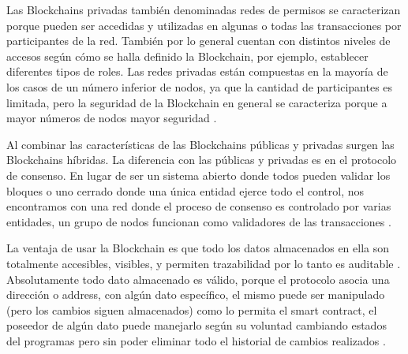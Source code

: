 Las  Blockchains privadas también denominadas redes de permisos se caracterizan porque  pueden ser accedidas y utilizadas en algunas o todas las transacciones
por participantes de la red.  También por lo general cuentan con  distintos niveles de accesos según cómo se halla definido la Blockchain, por ejemplo, establecer 
diferentes tipos de roles.
Las redes privadas están compuestas en la mayoría de los casos de un número inferior de nodos, ya que la cantidad de participantes 
es limitada, pero la seguridad de la  Blockchain en general se caracteriza  porque a mayor números de nodos mayor seguridad \cite[]{torres_Blockchain_nodate}.

Al combinar las características de las  Blockchains públicas y privadas surgen las
 Blockchains híbridas. La  diferencia con las públicas y privadas  es 
en el protocolo de consenso. En lugar de ser un sistema abierto donde todos pueden validar los
bloques o uno cerrado donde una única entidad ejerce todo el control, nos encontramos con una
red donde el proceso de consenso es controlado por varias entidades, un grupo de nodos
funcionan como validadores de las transacciones \cite[]{torres_Blockchain_nodate}.

La ventaja de usar la  Blockchain es que todo los datos almacenados en ella son totalmente
accesibles, visibles, y permiten trazabilidad por lo tanto es  auditable \cite[]{drescher_Blockchain_2017}.
Absolutamente todo dato almacenado 
es válido, porque el protocolo asocia una dirección o address, con algún dato específico, el 
mismo puede ser manipulado (pero los cambios siguen almacenados) como lo permita el smart contract, el poseedor de algún dato
puede manejarlo según su voluntad cambiando estados del programas pero sin poder eliminar todo el historial de cambios realizados \cite[]{drescher_Blockchain_2017}.